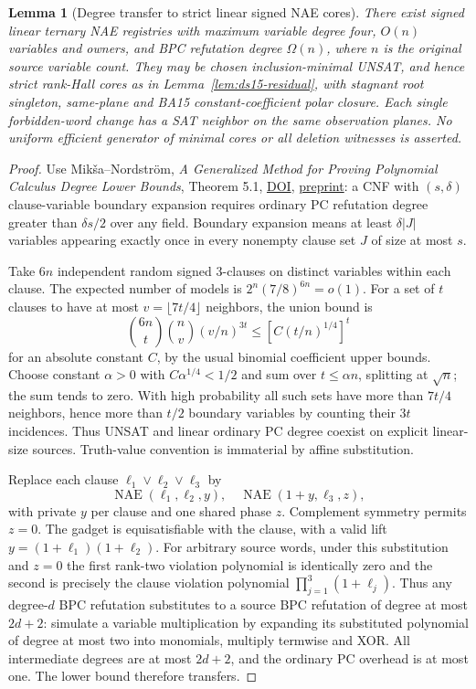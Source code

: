 \documentclass[11pt]{article}
\newtheorem{lemma}[theorem]{Lemma}
\begin{document}
\begin{lemma}[Degree transfer to strict linear signed NAE cores]\label{lem:da16-transfer}
There exist signed linear ternary NAE registries with maximum variable degree four, $O(n)$ variables and owners, and BPC refutation degree $\Omega(n)$, where $n$ is the original source variable count. They may be chosen inclusion-minimal UNSAT, and hence strict rank-Hall cores as in Lemma~\ref{lem:ds15-residual}, with stagnant root singleton, same-plane and BA15 constant-coefficient polar closure. Each single forbidden-word change has a SAT neighbor on the same observation planes. No uniform efficient generator of minimal cores or all deletion witnesses is asserted.
\end{lemma}
\begin{proof}
Use Mik\v{s}a--Nordstr\"om, \emph{A Generalized Method for Proving Polynomial Calculus Degree Lower Bounds}, Theorem 5.1, \href{https://doi.org/10.1145/3675668}{DOI}, \href{https://arxiv.org/abs/1505.01358}{preprint}: a CNF with $(s,\delta)$ clause-variable boundary expansion requires ordinary PC refutation degree greater than $\delta s/2$ over any field. Boundary expansion means at least $\delta |J|$ variables appearing exactly once in every nonempty clause set $J$ of size at most $s$.

Take $6n$ independent random signed 3-clauses on distinct variables within each clause. The expected number of models is $2^n(7/8)^{6n}=o(1)$. For a set of $t$ clauses to have at most $v=\lfloor7t/4\rfloor$ neighbors, the union bound is
\[
 {6n\choose t}{n\choose v}(v/n)^{3t}
 \le [C(t/n)^{1/4}]^t
\]
for an absolute constant $C$, by the usual binomial coefficient upper bounds. Choose constant $\alpha>0$ with $C\alpha^{1/4}<1/2$ and sum over $t\le\alpha n$, splitting at $\sqrt n$; the sum tends to zero. With high probability all such sets have more than $7t/4$ neighbors, hence more than $t/2$ boundary variables by counting their $3t$ incidences. Thus UNSAT and linear ordinary PC degree coexist on explicit linear-size sources. Truth-value convention is immaterial by affine substitution.

Replace each clause $\ell_1\vee\ell_2\vee\ell_3$ by
\[
 \operatorname{NAE}(\ell_1,\ell_2,y),\quad
 \operatorname{NAE}(1+y,\ell_3,z),
\]
with private $y$ per clause and one shared phase $z$. Complement symmetry permits $z=0$. The gadget is equisatisfiable with the clause, with a valid lift $y=(1+\ell_1)(1+\ell_2)$. For arbitrary source words, under this substitution and $z=0$ the first rank-two violation polynomial is identically zero and the second is precisely the clause violation polynomial $\prod_{j=1}^3(1+\ell_j)$. Thus any degree-$d$ BPC refutation substitutes to a source BPC refutation of degree at most $2d+2$: simulate a variable multiplication by expanding its substituted polynomial of degree at most two into monomials, multiply termwise and XOR. All intermediate degrees are at most $2d+2$, and the ordinary PC overhead is at most one. The lower bound therefore transfers.


\end{proof}
\end{document}
